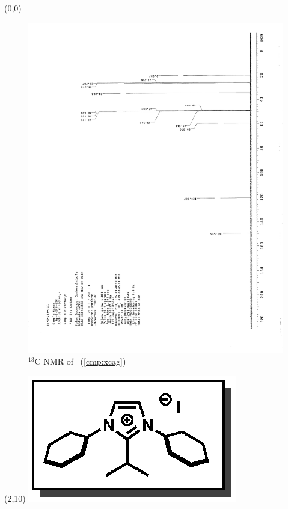 \clearpage
\begin{textblock}{20}(0,0)
\begin{figure}[htb]
\caption{$^{13}$C NMR of  \CMPxcag\ (\ref{cmp:xcag})}
\includegraphics[scale=0.75, trim = 0mm 0mm 0mm 5mm,
clip]{chp_alkylation/images/nmr/xcagC}
\vspace{-100pt}
\end{figure}
\end{textblock}
\begin{textblock}{1}(2,10)
\includegraphics[scale=0.8, angle=90]{chp_alkylation/images/xcag}
\end{textblock}
\clearpage

